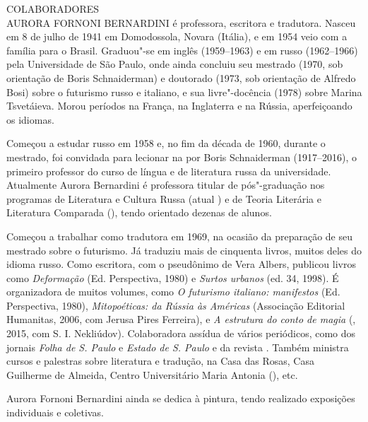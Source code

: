 \newpage
\MyriadPro

\noindent{}COLABORADORES\\

\noindent{}AURORA FORNONI BERNARDINI é professora, escritora e tradutora. Nasceu em
8 de julho de 1941 em Domodossola, Novara (Itália), e em 1954 veio com a
família para o Brasil. Graduou"-se em inglês (1959--1963) e em russo
(1962--1966) pela Universidade de São Paulo, onde ainda concluiu seu
mestrado (1970, sob orientação de Boris Schnaiderman) e doutorado (1973,
sob orientação de Alfredo Bosi) sobre o futurismo russo e italiano, e
sua livre"-docência (1978) sobre Marina Tsvetáieva. Morou períodos na
França, na Inglaterra e na Rússia, aperfeiçoando os idiomas.

Começou a estudar russo em 1958 e, no fim da década de 1960, durante o
mestrado, foi convidada para lecionar na \scalebox{0.8}{USP} por Boris Schnaiderman
(1917--2016), o primeiro professor do curso de língua e de literatura
russa da universidade. Atualmente Aurora Bernardini é professora titular
de pós"-graduação nos programas de Literatura e Cultura Russa (atual
\scalebox{0.8}{LETRA}) e de Teoria Literária e Literatura Comparada (\scalebox{0.8}{FFLCH/USP}), tendo
orientado dezenas de alunos.

Começou a trabalhar como tradutora em 1969, na ocasião da preparação de
seu mestrado sobre o futurismo. Já traduziu mais de cinquenta livros,
muitos deles do idioma russo. Como escritora, com o pseudônimo de Vera
Albers, publicou livros como \emph{Deformação} (Ed. Perspectiva, 1980) e
\emph{Surtos urbanos} (ed. 34, 1998). É organizadora de muitos volumes,
como \emph{O futurismo italiano: manifestos} (Ed. Perspectiva, 1980),
\emph{Mitopoéticas: da Rússia às Américas} (Associação Editorial
Humanitas, 2006, com Jerusa Pires Ferreira), e \emph{A estrutura do
conto de magia} (\scalebox{0.8}{UFSC}, 2015, com S. I. Nekliúdov). Colaboradora assídua
de vários periódicos, como dos jornais \emph{Folha de S. Paulo} e
\emph{Estado de S. Paulo} e da revista \scalebox{0.8}{CULT}. Também ministra
cursos e palestras sobre literatura e tradução, na Casa das Rosas, Casa
Guilherme de Almeida, Centro Universitário Maria Antonia (\scalebox{0.8}{USP}), etc.

Aurora Fornoni Bernardini ainda se dedica à pintura, tendo realizado
exposições individuais e coletivas.

